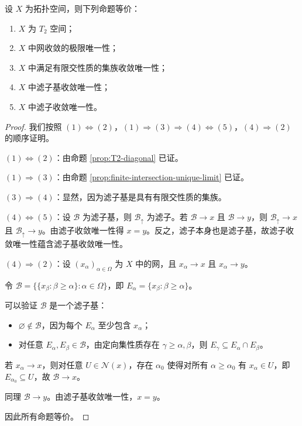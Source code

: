 \documentclass[lang=cn,a4paper,newtx,figureplace=section,tableplace=section]{elegantbook}
\begin{document}
\begin{proposition}\label{prop:T2-equivalences}
设 $X$ 为拓扑空间，则下列命题等价：
\begin{enumerate}
    \item $X$ 为 $T_2$ 空间；
    \item $X$ 中网收敛的极限唯一性；
    \item $X$ 中满足有限交性质的集族收敛唯一性；
    \item $X$ 中滤子基收敛唯一性；
    \item $X$ 中滤子收敛唯一性。
\end{enumerate}
\end{proposition}
\begin{proof}
我们按照 $(1)\Leftrightarrow(2)$，$(1)\Rightarrow(3)\Rightarrow(4)\Leftrightarrow(5)$，$(4)\Rightarrow(2)$ 的顺序证明。

$(1)\Leftrightarrow(2)$：由命题 \ref{prop:T2-diagonal} 已证。

$(1)\Rightarrow(3)$：由命题 \ref{prop:finite-intersection-unique-limit} 已证。

$(3)\Rightarrow(4)$：显然，因为滤子基是具有有限交性质的集族。

$(4)\Leftrightarrow(5)$：设 $\mathcal{B}$ 为滤子基，则 $\mathcal{B}_{\uparrow}$ 为滤子。若 $\mathcal{B} \to x$ 且 $\mathcal{B} \to y$，则 $\mathcal{B}_{\uparrow} \to x$ 且 $\mathcal{B}_{\uparrow} \to y$。由滤子收敛唯一性得 $x = y$。反之，滤子本身也是滤子基，故滤子收敛唯一性蕴含滤子基收敛唯一性。

$(4)\Rightarrow(2)$：设 $(x_\alpha)_{\alpha\in\Omega}$ 为 $X$ 中的网，且 $x_\alpha \to x$ 且 $x_\alpha \to y$。

令 $\mathcal{B} = \{\{x_\beta : \beta \geq \alpha\} : \alpha \in \Omega\}$，即 $E_\alpha = \{x_\beta : \beta \geq \alpha\}$。

可以验证 $\mathcal{B}$ 是一个滤子基：
\begin{itemize}
    \item $\varnothing \notin \mathcal{B}$，因为每个 $E_\alpha$ 至少包含 $x_\alpha$；
    \item 对任意 $E_\alpha, E_\beta \in \mathcal{B}$，由定向集性质存在 $\gamma \geq \alpha, \beta$，则 $E_\gamma \subseteq E_\alpha \cap E_\beta$。
\end{itemize}

若 $x_\alpha \to x$，则对任意 $U \in \mathcal{N}(x)$，存在 $\alpha_0$ 使得对所有 $\alpha \geq \alpha_0$ 有 $x_\alpha \in U$，即 $E_{\alpha_0} \subseteq U$，故 $\mathcal{B} \to x$。

同理 $\mathcal{B} \to y$。由滤子基收敛唯一性，$x = y$。

因此所有命题等价。
\end{proof}
\end{document}

